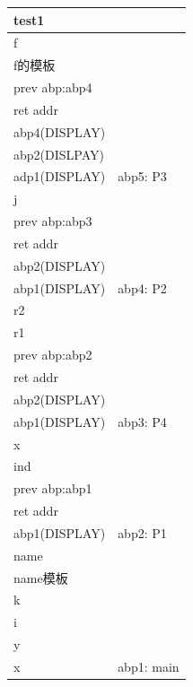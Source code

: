 \documentclass[UTF8]{ctexart} %
\begin{document}
\begin{table}[H]
    \centering
    \begin{tabular}{|p{3cm}<{\centering}|p{2cm}<{\centering}|}
        \hline
        test1         &            \\
        \hline
        f             &            \\
        \hline
        f的模板          &            \\
        \hline
        prev abp:abp4 &            \\
        \hline
        ret addr      &            \\
        \hline
        abp4(DISPLAY) &            \\
        \hline
        abp2(DISLPAY) &            \\
        \hline
        adp1(DISPLAY) & abp5: P3   \\
        \hline
        j             &            \\
        \hline
        prev abp:abp3 &            \\
        \hline
        ret addr      &            \\
        \hline
        abp2(DISPLAY) &            \\
        \hline
        abp1(DISPLAY) & abp4: P2   \\
        \hline
        r2            &            \\
        \hline
        r1            &            \\
        \hline
        prev abp:abp2 &            \\
        \hline
        ret addr      &            \\
        \hline
        abp2(DISPLAY) &            \\
        \hline
        abp1(DISPLAY) & abp3: P4   \\
        \hline
        x             &            \\
        \hline
        ind           &            \\
        \hline
        prev abp:abp1 &            \\
        \hline
        ret addr      &            \\
        \hline
        abp1(DISPLAY) & abp2: P1   \\
        \hline
        name          &            \\
        \hline
        name模板        &            \\
        \hline
        k             &            \\
        \hline
        i             &            \\
        \hline
        y             &            \\
        \hline
        x             & abp1: main \\
        \hline
    \end{tabular}
\end{table}
\end{document}
